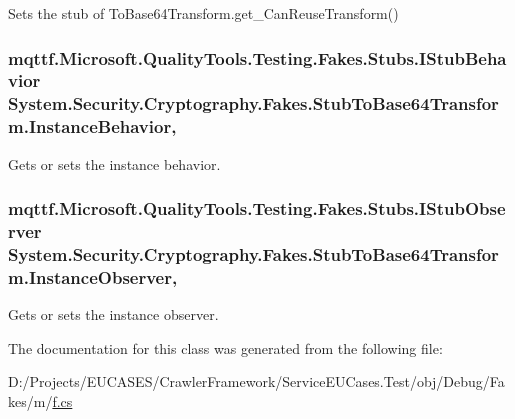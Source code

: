 Sets the stub of To\-Base64\-Transform.\-get\-\_\-\-Can\-Reuse\-Transform()

\hypertarget{class_system_1_1_security_1_1_cryptography_1_1_fakes_1_1_stub_to_base64_transform_adc2c4215c2838818ef32f1ff12bae86a}{
\subsubsection[{Instance\-Behavior}]{\setlength{\rightskip}{0pt plus 5cm}mqttf.\-Microsoft.\-Quality\-Tools.\-Testing.\-Fakes.\-Stubs.\-I\-Stub\-Behavior System.\-Security.\-Cryptography.\-Fakes.\-Stub\-To\-Base64\-Transform.\-Instance\-Behavior\hspace{0.3cm}{\ttfamily [get]}, {\ttfamily [set]}}}\label{class_system_1_1_security_1_1_cryptography_1_1_fakes_1_1_stub_to_base64_transform_adc2c4215c2838818ef32f1ff12bae86a}


Gets or sets the instance behavior.

\hypertarget{class_system_1_1_security_1_1_cryptography_1_1_fakes_1_1_stub_to_base64_transform_a66daf55e5237c270a3a15d5df561acdb}{
\subsubsection[{Instance\-Observer}]{\setlength{\rightskip}{0pt plus 5cm}mqttf.\-Microsoft.\-Quality\-Tools.\-Testing.\-Fakes.\-Stubs.\-I\-Stub\-Observer System.\-Security.\-Cryptography.\-Fakes.\-Stub\-To\-Base64\-Transform.\-Instance\-Observer\hspace{0.3cm}{\ttfamily [get]}, {\ttfamily [set]}}}\label{class_system_1_1_security_1_1_cryptography_1_1_fakes_1_1_stub_to_base64_transform_a66daf55e5237c270a3a15d5df561acdb}


Gets or sets the instance observer.



The documentation for this class was generated from the following file\-:\begin{DoxyCompactItemize}
\item 
D\-:/\-Projects/\-E\-U\-C\-A\-S\-E\-S/\-Crawler\-Framework/\-Service\-E\-U\-Cases.\-Test/obj/\-Debug/\-Fakes/m/\hyperlink{m_2f_8cs}{f.\-cs}\end{DoxyCompactItemize}
